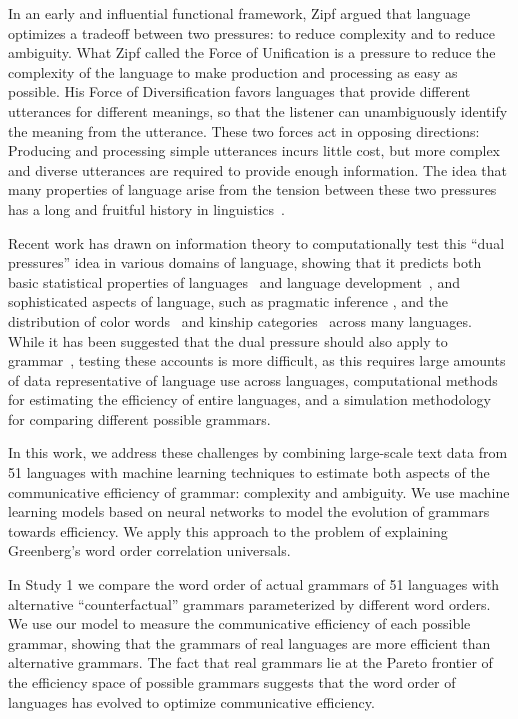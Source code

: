 \documentclass[9pt,twocolumn,twoside,lineno]{pnas-new}
\begin{document}
In an early and  influential functional framework,
Zipf \cite{zipf1949human} argued that language optimizes a tradeoff between two pressures: to reduce complexity and to reduce ambiguity.
What Zipf called the Force of Unification is a pressure to reduce the complexity of the language to make production and processing as easy as possible.
His Force of Diversification favors languages that provide different utterances for different meanings, so that the listener can unambiguously identify the meaning from the utterance.
These two forces act in opposing directions:
Producing and processing simple utterances incurs little cost, but more complex and diverse utterances are required  to provide enough information.
The idea that many properties of language arise from the tension between these two pressures has a long and fruitful history in linguistics~\cite{gabelentz1901sprachwissenschaft,horn1984toward, lindblom1990explaining, schwartz1997dispersion, hawkins2004efficiency, haspelmath2006against}.


Recent work has drawn on information theory  to computationally test this ``dual pressures'' idea in various domains of language, showing that it predicts
both basic statistical properties of languages~\cite{ferreri2003least} and language development~\cite{smith2013linguistic},
and sophisticated aspects of language, such as pragmatic inference \cite{frank2012predicting}, and the distribution of color words~\cite{zaslavsky2018efficient} and kinship categories~\cite{kemp2012kinship} across many languages.
While it has been suggested that the dual pressure  should also apply to grammar~\cite{hawkins2004efficiency}, testing these accounts is more difficult, as this requires  large amounts of data representative of language use across languages,  computational methods for estimating the efficiency of entire languages, and a simulation methodology for comparing different possible grammars.

In this work, we address these challenges by combining large-scale text data from 51 languages with machine learning techniques to estimate both aspects of the communicative efficiency of grammar: complexity and ambiguity.
We use machine learning models based on neural networks to model the evolution of grammars towards efficiency.
We apply this approach to the problem of explaining Greenberg's word order correlation universals.

In Study 1 we compare the word order of actual grammars of 51 languages with alternative ``counterfactual'' grammars parameterized by different word orders. We use our model to measure the communicative efficiency of each possible grammar, showing  that the grammars of real languages are more efficient than alternative  grammars. The fact that real grammars lie at the Pareto frontier of the efficiency space of possible  grammars suggests that the word order of languages has evolved to optimize communicative efficiency.
\end{document}
